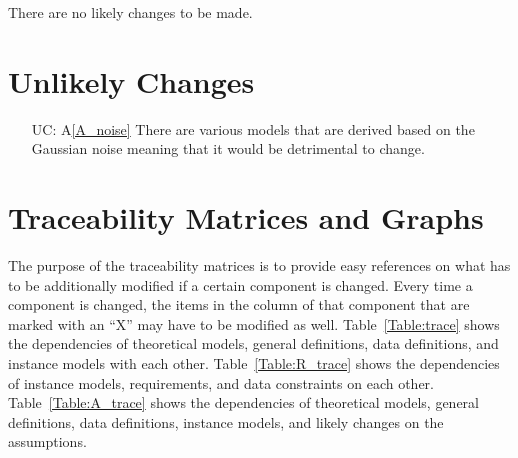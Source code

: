 \documentclass[12pt]{article}
\newcommand{\aref}[1]{A\ref{#1}}
\newcounter{lcnum} %
\newcounter{ucnum} %
\begin{document}
There are no likely changes to be made.




\section{Unlikely Changes}    

\noindent \begin{itemize}

\item[UC\refstepcounter{ucnum}\theucnum\label{UC_noise}:] \aref{A_noise} There are various models that are derived based on the Gaussian noise meaning that it would be detrimental to change.

\end{itemize}

\section{Traceability Matrices and Graphs}

The purpose of the traceability matrices is to provide easy references on what
has to be additionally modified if a certain component is changed.  Every time a
component is changed, the items in the column of that component that are marked
with an ``X'' may have to be modified as well.  Table~\ref{Table:trace} shows the
dependencies of theoretical models, general definitions, data definitions, and
instance models with each other. Table~\ref{Table:R_trace} shows the
dependencies of instance models, requirements, and data constraints on each
other. Table~\ref{Table:A_trace} shows the dependencies of theoretical models,
general definitions, data definitions, instance models, and likely changes on
the assumptions.



\end{document}
